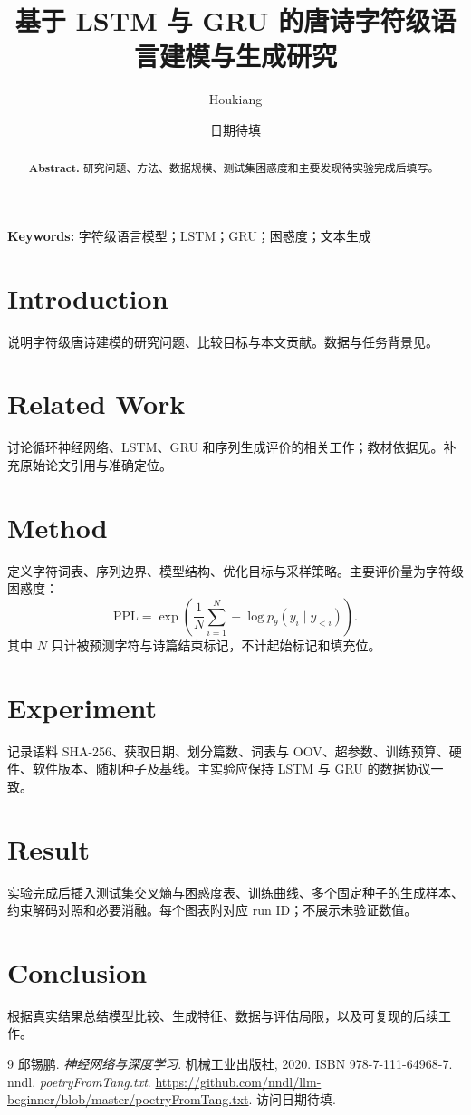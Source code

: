 \documentclass[UTF8,a4paper,11pt]{ctexart}
\title{基于 LSTM 与 GRU 的唐诗字符级语言建模与生成研究}
\author{Houkiang}
\date{日期待填}
\begin{document}
\maketitle

\begin{abstract}
\noindent\textbf{Abstract.}
研究问题、方法、数据规模、测试集困惑度和主要发现待实验完成后填写。
\end{abstract}

\noindent\textbf{Keywords:} 字符级语言模型；LSTM；GRU；困惑度；文本生成

\section{Introduction}
说明字符级唐诗建模的研究问题、比较目标与本文贡献。数据与任务背景见\cite{tangdata}。

\section{Related Work}
讨论循环神经网络、LSTM、GRU 和序列生成评价的相关工作；教材依据见\cite{nndl2020}。补充原始论文引用与准确定位。

\section{Method}
定义字符词表、序列边界、模型结构、优化目标与采样策略。主要评价量为字符级困惑度：
\begin{equation}
  \mathrm{PPL}=\exp\!\left(\frac{1}{N}\sum_{i=1}^{N}-\log p_{\theta}(y_i\mid y_{<i})\right).
\end{equation}
其中 $N$ 只计被预测字符与诗篇结束标记，不计起始标记和填充位。

\section{Experiment}
记录语料 SHA-256、获取日期、划分篇数、词表与 OOV、超参数、训练预算、硬件、软件版本、随机种子及基线。主实验应保持 LSTM 与 GRU 的数据协议一致。

\section{Result}
实验完成后插入测试集交叉熵与困惑度表、训练曲线、多个固定种子的生成样本、约束解码对照和必要消融。每个图表附对应 run ID；不展示未验证数值。

\section{Conclusion}
根据真实结果总结模型比较、生成特征、数据与评估局限，以及可复现的后续工作。

\begin{thebibliography}{9}
邱锡鹏. \textit{神经网络与深度学习}. 机械工业出版社, 2020. ISBN 978-7-111-64968-7.
nndl. \textit{poetryFromTang.txt}. \url{https://github.com/nndl/llm-beginner/blob/master/poetryFromTang.txt}. 访问日期待填.
\end{thebibliography}
\end{document}
